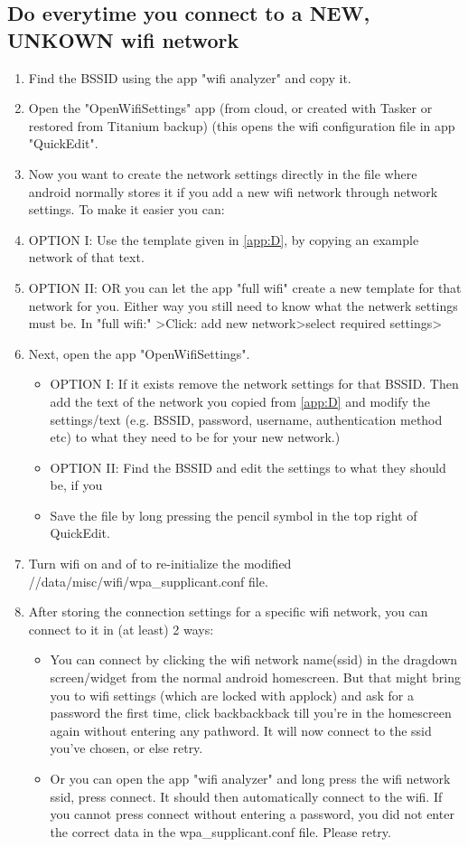 \subsection{Do everytime you connect to a NEW, UNKOWN wifi network}
\begin{enumerate}
    \item Find the BSSID using the app "wifi analyzer" and copy it.
    \item Open the "OpenWifiSettings" app (from cloud, or created with Tasker or restored from Titanium backup) (this opens the wifi configuration file in app "QuickEdit".
    \item Now you want to create the network settings directly in the file where android normally stores it if you add a new wifi network through network settings. To make it easier you can:
    \item OPTION I: Use the template given in \cref{app:D}, by copying an example network of that text. 
    \item OPTION II: OR you can let the app "full wifi" create a new template for that network for you. Either way you still need to know what the netwerk settings must be. In "full wifi:" \textgreater Click: add new network\textgreater select required settings\textgreater 
    \item Next, open the app "OpenWifiSettings".
            \begin{itemize}
            \item OPTION I: If it exists remove the network settings for that BSSID. Then add the text of the network you copied from \cref{app:D} and modify the settings/text (e.g. BSSID, password, username, authentication method etc) to what they need to be for your new network.)
            \item OPTION II: Find the BSSID and edit the settings to what they should be, if you  
            \item Save the file by long pressing the pencil symbol in the top right of QuickEdit.
        \end{itemize}

    \item Turn wifi on and of to re-initialize the modified //data/misc/wifi/wpa\_supplicant.conf file.
    \item After storing the connection settings for a specific wifi network, you can connect to it in (at least) 2 ways:
    \begin{itemize}
        \item You can connect by clicking the wifi network name(ssid) in the dragdown screen/widget from the normal android homescreen. But that might bring you to wifi settings (which are locked with applock) and ask for a password the first time, click backbackback till you're in the homescreen again without entering any pathword. It will now connect to the ssid you've chosen, or else retry. 
        \item Or you can open the app "wifi analyzer" and long press the wifi network ssid, press connect. It should then automatically connect to the wifi. If you cannot press connect without entering a password, you did not enter the correct data in the wpa\_supplicant.conf file. Please retry.
        

\end{itemize}
\end{enumerate}
